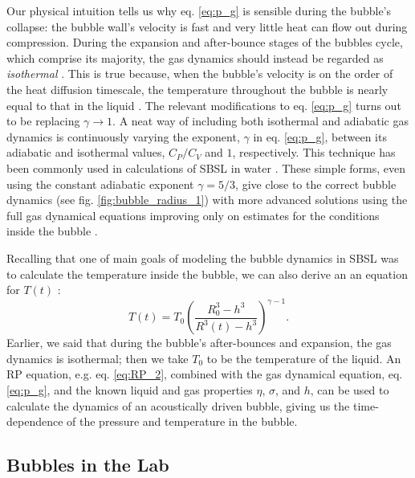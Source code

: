 \documentclass[11pt,prb,aps,nofootinbib,superscriptaddress,floatfix]{revtex4-2}
\begin{document}
Our physical intuition tells us why eq. \ref{eq:p_g} is sensible during the bubble's collapse: the bubble wall's velocity is fast and very little heat can flow out during compression. During the expansion and after-bounce stages of the bubbles cycle, which comprise its majority, the gas dynamics should instead be regarded as \emph{isothermal} \cite{brenner2002single}. This is true because, when the bubble's velocity is on the order of the heat diffusion timescale, the temperature throughout the bubble is nearly equal to that in the liquid \cite{prosperetti1999old,brenner2002single,yasui2018acoustic}. The relevant modifications to eq. \ref{eq:p_g} turns out to be replacing $\gamma\rightarrow 1$. A neat way of including both isothermal and adiabatic gas dynamics is continuously varying the exponent, $\gamma$ in eq. \ref{eq:p_g}, between its adiabatic and isothermal values, $C_P/C_V$ and $1$, respectively. This technique has been commonly used in calculations of SBSL in water \cite{hilgenfeldt1999simple,hilgenfeldt1999sonoluminescence,prosperetti1986bubble,brenner2002single}. These simple forms, even using the constant adiabatic exponent $\gamma=5/3$, give close to the correct bubble dynamics (see fig. \ref{fig:bubble_radius_1}) with more advanced solutions using the full gas dynamical equations improving only on estimates for the conditions inside the bubble \cite{brenner2002single,yasui2018acoustic}.

Recalling that one of main goals of modeling the bubble dynamics in SBSL was to calculate the temperature inside the bubble, we can also derive an an equation for $T(t)$ \cite{barber1997defining,brenner2002single,sivasubramanian2002temperature}:
\begin{equation}
    T(t) = T_0 \left( \frac{R_0^3-h^3}{R^3(t)-h^3} \right)^ {\gamma-1}.
    \label{eq:T(t)}
\end{equation}
Earlier, we said that during the bubble's after-bounces and expansion, the gas dynamics is isothermal; then we take $T_0$ to be the temperature of the liquid. An RP equation, e.g. eq. \ref{eq:RP_2}, combined with the gas dynamical equation, eq. \ref{eq:p_g}, and the known liquid and gas properties $\eta$, $\sigma$, and $h$, can be used to calculate the dynamics of an acoustically driven bubble, giving us the time-dependence of the pressure and temperature in the bubble. 

\subsection{Bubbles in the Lab}
\end{document}
